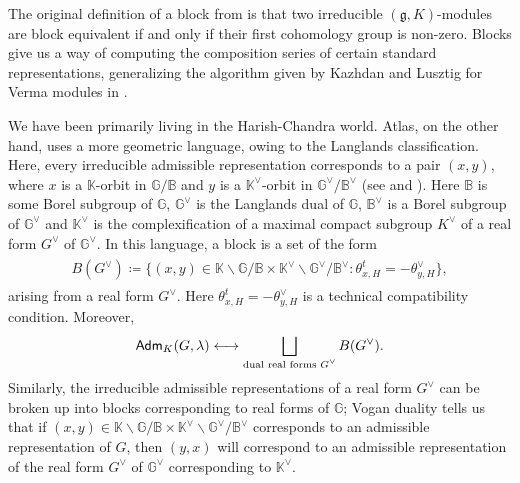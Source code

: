 \noindent The original definition of a block from \cite[Definition 9.2.1]{Vog81} is that two irreducible $(\mathfrak{g}, K)$-modules are block equivalent if and only if their first cohomology group is non-zero. Blocks give us a way of computing the composition series of certain standard representations, generalizing the algorithm given by Kazhdan and Lusztig for Verma modules in \cite{KL79}.\\

\noindent\begin{remark} We have been primarily living in the Harish-Chandra world. Atlas, on the other hand, uses a more geometric language, owing to the Langlands classification. Here, every irreducible admissible representation corresponds to a pair $(x, y)$, where $x$ is a $\mathbb{K}$-orbit in $\mathbb{G}/\mathbb{B}$ and $y$ is a $\mathbb{K}^\vee$-orbit in $\mathbb{G}^\vee/\mathbb{B}^\vee$ (see \cite[\S 10]{AC09} and \cite[\S 8]{Ada08}). Here $\mathbb{B}$ is some Borel subgroup of $\mathbb{G}$, $\mathbb{G}^\vee$ is the Langlands dual of $\mathbb{G}$, $\mathbb{B}^\vee$ is a Borel subgroup of $\mathbb{G}^\vee$ and $\mathbb{K}^\vee$ is the complexification of a maximal compact subgroup $K^\vee$ of a real form $G^\vee$ of $\mathbb{G}^\vee$. In this language, a block is a set of the form
\begin{align*}
\begin{split}
B(G^\vee) \coloneqq \{(x, y) \in \mathbb{K}\backslash\mathbb{G}/\mathbb{B} \times \mathbb{K}^\vee\backslash\mathbb{G}^\vee/\mathbb{B}^\vee : \theta_{x,H}^t = -\theta_{y,H}^\vee\},
\end{split}
\end{align*}
\noindent arising from a real form $G^\vee$. Here $\theta_{x,H}^t = -\theta_{y,H}^\vee$ is a technical compatibility condition. Moreover,
\begin{align*}
\begin{split}
\textup{\textsf{Adm}}_K(G, \lambda) \longleftrightarrow \bigsqcup_\textup{dual real forms $G^\vee$} B(G^\vee).
\end{split}
\end{align*}
\noindent Similarly, the irreducible admissible representations of a real form $G^\vee$ can be broken up into blocks corresponding to real forms of $\mathbb{G}$; Vogan duality tells us that if $(x, y) \in \mathbb{K}\backslash\mathbb{G}/\mathbb{B} \times \mathbb{K}^\vee\backslash\mathbb{G}^\vee/\mathbb{B}^\vee$ corresponds to an admissible representation of $G$, then $(y, x)$ will correspond to an admissible representation of the real form $G^\vee$ of $\mathbb{G}^\vee$ corresponding to $\mathbb{K}^\vee$.\\
\end{remark}

